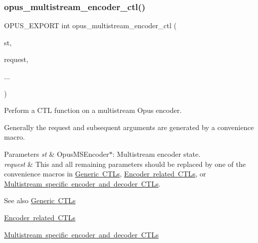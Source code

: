 \mbox{\label{group__opus__multistream_ga0f8756c84c7c62a38f99fb5cd6ed68af}} 
\subsubsection{\texorpdfstring{opus\_multistream\_encoder\_ctl()}{opus\_multistream\_encoder\_ctl()}}
{\footnotesize\ttfamily O\+P\+U\+S\+\_\+\+E\+X\+P\+O\+RT int opus\+\_\+multistream\+\_\+encoder\+\_\+ctl (\begin{DoxyParamCaption}\item[{\mbox{\hyperlink{group__opus__multistream_gae5826674d142fc873ebc1d781c507dd7}{Opus\+M\+S\+Encoder}} $\ast$}]{st,  }\item[{int}]{request,  }\item[{}]{... }\end{DoxyParamCaption})}

Perform a C\+TL function on a multistream Opus encoder.

Generally the request and subsequent arguments are generated by a convenience macro. 
\begin{DoxyParams}{Parameters}
{\em st} & {\ttfamily Opus\+M\+S\+Encoder$\ast$}\+: Multistream encoder state. \\
\hline
{\em request} & This and all remaining parameters should be replaced by one of the convenience macros in \mbox{\hyperlink{group__opus__genericctls}{Generic C\+T\+Ls}}, \mbox{\hyperlink{group__opus__encoderctls}{Encoder related C\+T\+Ls}}, or \mbox{\hyperlink{group__opus__multistream__ctls}{Multistream specific encoder and decoder C\+T\+Ls}}. \\
\hline
\end{DoxyParams}
\begin{DoxySeeAlso}{See also}
\mbox{\hyperlink{group__opus__genericctls}{Generic C\+T\+Ls}} 

\mbox{\hyperlink{group__opus__encoderctls}{Encoder related C\+T\+Ls}} 

\mbox{\hyperlink{group__opus__multistream__ctls}{Multistream specific encoder and decoder C\+T\+Ls}} 
\end{DoxySeeAlso}
\mbox{\label{group__opus__multistream_ga24b8a4ceb20a142069084cb1edd28a30}} 
